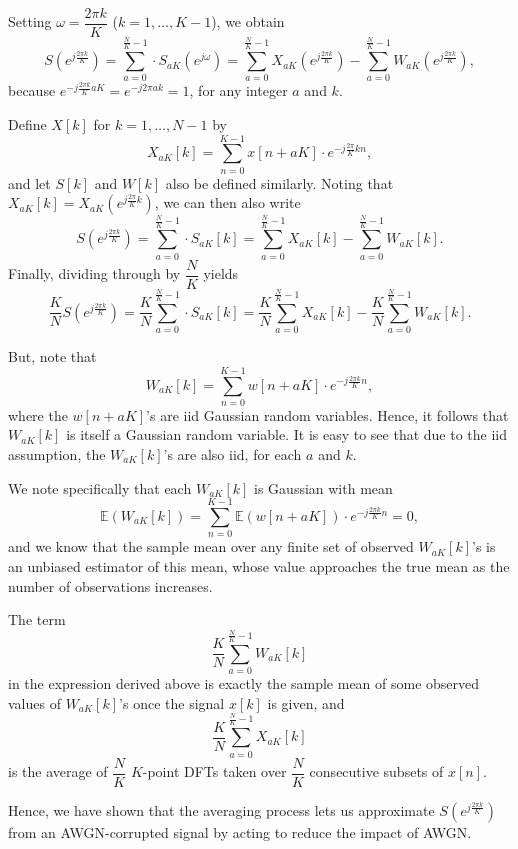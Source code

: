 \documentclass{article}[a4paper]
\begin{document}
	Setting $\omega = \dfrac{2\pi k}{K}$ ($k = 1, \dots, K-1$), we obtain \[
		S\left(e^{j\frac{2\pi k}{K}}\right)
		=
		\sum_{a=0}^{\frac{N}{K}-1} \cdot S_{aK} \left(e^{j\omega}\right)
		=
		\sum_{a=0}^{\frac{N}{K}-1} X_{aK} \left(e^{j\frac{2\pi k}{K}}\right)
		-
		\sum_{a=0}^{\frac{N}{K}-1} W_{aK} \left(e^{j\frac{2\pi k}{K}}\right),
	\] because $e^{-j\frac{2\pi k}{K} aK} = e^{-j 2\pi ak} = 1$, for any integer $a$ and $k$.
	
	Define $X[k]$ for $k=1,\dots,N-1$ by \[
		X_{aK}[k] = \sum_{n=0}^{K-1} x[n + aK] \cdot e^{-j\frac{2\pi}{K} kn},
	\] and let $S[k]$ and $W[k]$ also be defined similarly. Noting that $X_{aK}[k] = X_{aK} \left(e^{j\frac{2\pi}{K} k}\right)$, we can then also write \[
		S\left(e^{j\frac{2\pi k}{K}}\right)
		=
		\sum_{a=0}^{\frac{N}{K}-1} \cdot S_{aK} [k]
		=
		\sum_{a=0}^{\frac{N}{K}-1} X_{aK} [k]
		-
		\sum_{a=0}^{\frac{N}{K}-1} W_{aK} [k].
	\] Finally, dividing through by $\dfrac{N}{K}$ yields \[
		\dfrac{K}{N} S\left(e^{j\frac{2\pi k}{K}}\right)
		=
		\dfrac{K}{N} \sum_{a=0}^{\frac{N}{K}-1} \cdot S_{aK} [k]
		=
		\dfrac{K}{N} \sum_{a=0}^{\frac{N}{K}-1} X_{aK} [k]
		-
		\dfrac{K}{N} \sum_{a=0}^{\frac{N}{K}-1} W_{aK} [k].
	\]
	
	But, note that \[
		W_{aK}[k] = \sum_{n=0}^{K-1} w[n + aK] \cdot e^{-j\frac{2\pi k}{K} n},
	\] where the $w[n + aK]$'s are iid Gaussian random variables. Hence, it follows that $W_{aK}[k]$ is itself a Gaussian random variable. It is easy to see that due to the iid assumption, the $W_{aK}[k]$'s are also iid, for each $a$ and $k$.
	
	We note specifically that each $W_{aK}[k]$ is Gaussian with mean \[
		\mathbb{E}\left(W_{aK}[k]\right)
		=
		\sum_{n=0}^{K-1} \mathbb{E}\left(w[n + aK]\right) \cdot e^{-j\frac{2\pi k}{K} n}
		= 0,
	\] and we know that the sample mean over any finite set of observed $W_{aK}[k]$'s is an unbiased estimator of this mean, whose value approaches the true mean as the number of observations increases.
	
	The term \[
		\dfrac{K}{N} \sum_{a=0}^{\frac{N}{K}-1} W_{aK} [k]
	\] in the expression derived above is exactly the sample mean of some observed values of $W_{aK}[k]$'s once the signal $x[k]$ is given, and \[
		\dfrac{K}{N} \sum_{a=0}^{\frac{N}{K}-1} X_{aK} [k]
	\] is the average of $\dfrac{N}{K}$ $K$-point DFTs taken over $\dfrac{N}{K}$ consecutive subsets of $x[n]$.
	
	Hence, we have shown that the averaging process lets us approximate $S\left(e^{j\frac{2\pi k}{K}}\right)$ from an AWGN-corrupted signal by acting to reduce the impact of AWGN.
	\medskip
	
\end{document}
